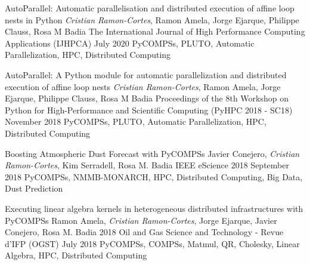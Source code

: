 \begin{publications}
    \publication
        {AutoParallel: Automatic parallelisation and distributed execution of affine loop nests in Python}
        {\textit{Cristian Ramon-Cortes}, Ramon Amela, Jorge Ejarque, Philippe Clauss, Rosa M Badia}
        {The International Journal of High Performance Computing Applications (IJHPCA)}
        {July 2020}
        {PyCOMPSs, PLUTO, Automatic Parallelization, HPC, Distributed Computing}
        {}
    
    \publication
        {AutoParallel: A Python module for automatic parallelization and distributed execution of affine loop nests}
        {\textit{Cristian Ramon-Cortes}, Ramon Amela, Jorge Ejarque, Philippe Clauss, Rosa M Badia}
        {Proceedings of the 8th Workshop on Python for High-Performance and Scientific Computing (PyHPC 2018 - SC18)}
        {November 2018}
        {PyCOMPSs, PLUTO, Automatic Parallelization, HPC, Distributed Computing}
        {}
        
    \publication
        {Boosting Atmospheric Dust Forecast with PyCOMPSs}
        {Javier Conejero, \textit{Cristian Ramon-Cortes}, Kim Serradell, Rosa M. Badia}
        {IEEE eScience 2018}
        {September 2018}
        {PyCOMPSs, NMMB-MONARCH, HPC, Distributed Computing, Big Data, Dust Prediction}
        {}
        
    \publication
        {Executing linear algebra kernels in heterogeneous distributed infrastructures with PyCOMPSs}
        {Ramon Amela, \textit{Cristian Ramon-Cortes}, Jorge Ejarque, Javier Conejero, Rosa M. Badia}
        {2018 Oil and Gas Science and Technology - Revue d’IFP (OGST)}
        {July 2018}
        {PyCOMPSs, COMPSs, Matmul, QR, Cholesky, Linear Algebra, HPC, Distributed Computing}
        {}
\end{publications}


